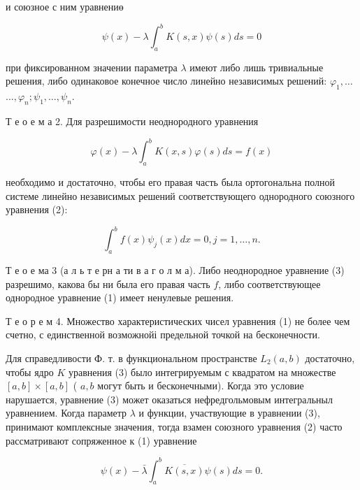 \documentclass[10pt]{article}
\begin{document}
и союзное с ним уравнениө



\[

\psi(x)-\lambda \int_{a}^{b} K(s, x) \psi(s) d s=0

\]



при фиксированном значении параметра $\lambda$ имеют либо лишь тривиальные решения, либо одинаковое конечное число линейно независимых решений: $\varphi_{1}, \ldots$ $\ldots, \varphi_{n} ; \psi_{1}, \ldots, \psi_{n}$.



Т е о е м а 2. Для разрешимости неоднородного уравнения



\[

\varphi(x)-\lambda \int_{a}^{b} K(x, s) \varphi(s) d s=f(x)

\]



необходимо и достаточно, чтобы его правая часть была ортогональна полной системе линейно независимых решений соответствующего однородного союзного уравнения (2):



\[

\int_{a}^{b} f(x) \psi_{j}(x) d x=0, j=1, \ldots, n .

\]



Т е о е ма 3 (а л ь т е рн а ти в а г о л м а). Либо неоднородное уравнение (3) разрешимо, какова бы ни была его правая часть $f$, либо соответствующее однородное уравнение (1) имеет ненулевые решения.



Т е о р е м 4. Множество характеристических чисел уравнения (1) не более чем счетно, с единственной возможнойі предельной точкой на бесконечности.



Для справедливости Ф. т. в функциональном пространстве $L_{2}(a, b)$ достаточно, чтобы ядро $K$ уравнения (3) было интегрируемым с квадратом на множестве $[a, b] \times[a, b]$ ( $a, b$ могут быть и бесконечными). Когда это условие нарушается, уравнение (3) может оказаться нефредгольмовым интегральныл уравнением. Когда параметр $\lambda$ и функции, участвующие в уравнении (3), принимают комплексные значения, тогда взамен союзного уравнения (2) часто рассматривают сопряженное к (1) уравнение



\[

\psi(x)-\bar{\lambda} \int_{a}^{b} \overline{K(s, x)} \psi(s) d s=0 .

\]
\end{document}
